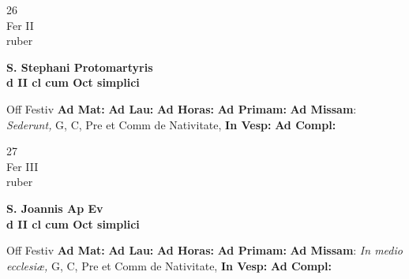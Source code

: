 \documentclass[10pt, openany]{book}
\begin{document}
        \begin{center}
            \begin{minipage}{3.5in}
                \vspace{2em}
                \begin{minipage}{0.5in}
                    {\Huge 26} \\
                    {\normalsize Fer II} \\
                    {\normalsize ruber}
                \end{minipage}
                \begin{minipage}{3.0in}
                    \textbf{ \large S. Stephani Protomartyris \\
                    \textnormal{\normalsize d II cl cum Oct simplici}} \\ 
                \end{minipage}
                \begin{justify}Off Festiv
                    \textbf{Ad Mat: }
                    \textbf{Ad Lau: }
                    \textbf{Ad Horas: }
                    \textbf{Ad Primam: }\textbf{Ad Missam}: \textit{Sederunt,} G, C, Pre et Comm de Nativitate,  
                    \textbf{In Vesp: }
                    \textbf{Ad Compl: }
                \end{justify}
            \end{minipage}
        \end{center}
    
        \begin{center}
            \begin{minipage}{3.5in}
                \vspace{2em}
                \begin{minipage}{0.5in}
                    {\Huge 27} \\
                    {\normalsize Fer III} \\
                    {\normalsize ruber}
                \end{minipage}
                \begin{minipage}{3.0in}
                    \textbf{ \large S. Joannis Ap Ev \\
                    \textnormal{\normalsize d II cl cum Oct simplici}} \\ 
                \end{minipage}
                \begin{justify}Off Festiv
                    \textbf{Ad Mat: }
                    \textbf{Ad Lau: }
                    \textbf{Ad Horas: }
                    \textbf{Ad Primam: }\textbf{Ad Missam}: \textit{In medio ecclesiæ,} G, C, Pre et Comm de Nativitate,  
                    \textbf{In Vesp: }
                    \textbf{Ad Compl: }
                \end{justify}
            \end{minipage}
        \end{center}
    
\end{document}
